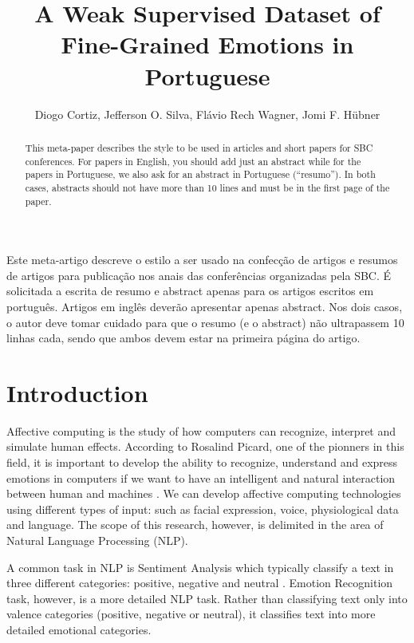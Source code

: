 \documentclass[12pt]{article}
\title{A Weak Supervised Dataset of Fine-Grained Emotions in Portuguese}
\author{Diogo Cortiz\inst{1,2}, Jefferson O. Silva\inst{2}, Flávio Rech
  Wagner\inst{2}, Jomi F. Hübner\inst{3} }
\begin{document}
\maketitle

\begin{abstract}
  This meta-paper describes the style to be used in articles and short papers
  for SBC conferences. For papers in English, you should add just an abstract
  while for the papers in Portuguese, we also ask for an abstract in
  Portuguese (``resumo''). In both cases, abstracts should not have more than
  10 lines and must be in the first page of the paper.
\end{abstract}

\begin{resumo}
  Este meta-artigo descreve o estilo a ser usado na confecção de artigos e
  resumos de artigos para publicação nos anais das conferências organizadas
  pela SBC. É solicitada a escrita de resumo e abstract apenas para os artigos
  escritos em português. Artigos em inglês deverão apresentar apenas abstract.
  Nos dois casos, o autor deve tomar cuidado para que o resumo (e o abstract)
  não ultrapassem 10 linhas cada, sendo que ambos devem estar na primeira
  página do artigo.
\end{resumo}


\section{Introduction}
\label{sec:introduction}

Affective computing is the study of how computers can recognize, interpret and simulate human effects. According to Rosalind Picard, one of the pionners in this field, it is important to develop the ability to recognize, understand and express emotions in computers if we want to have an intelligent and natural interaction between human and machines \cite{Rosalind2000}. We can develop affective computing technologies using different types of input: such as facial expression, voice, physiological data and language. The scope of this research, however, is delimited in the area of Natural Language Processing (NLP).

A common task in NLP is Sentiment Analysis which typically classify a text in three different categories: positive, negative and neutral \cite{Drus2019}. Emotion Recognition task, however, is a more detailed NLP task. Rather than classifying text only into valence categories (positive, negative or neutral), it classifies text into more detailed emotional categories.
\end{document}
